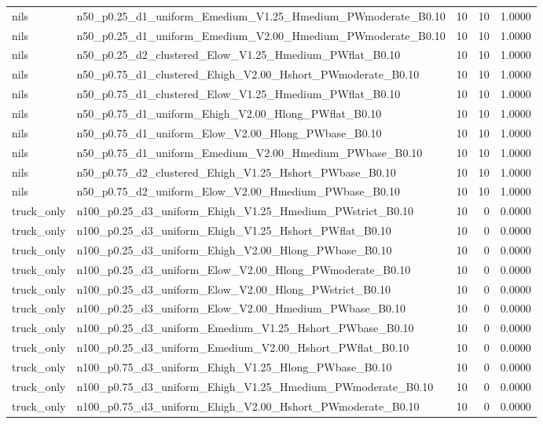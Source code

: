 \begin{tabular}{llrrr}
nils & n50_p0.25_d1_uniform_Emedium_V1.25_Hmedium_PWmoderate_B0.10 & 10 & 10 & 1.0000 \\
nils & n50_p0.25_d1_uniform_Emedium_V2.00_Hmedium_PWmoderate_B0.10 & 10 & 10 & 1.0000 \\
nils & n50_p0.25_d2_clustered_Elow_V1.25_Hmedium_PWflat_B0.10 & 10 & 10 & 1.0000 \\
nils & n50_p0.75_d1_clustered_Ehigh_V2.00_Hshort_PWmoderate_B0.10 & 10 & 10 & 1.0000 \\
nils & n50_p0.75_d1_clustered_Elow_V1.25_Hmedium_PWflat_B0.10 & 10 & 10 & 1.0000 \\
nils & n50_p0.75_d1_uniform_Ehigh_V2.00_Hlong_PWflat_B0.10 & 10 & 10 & 1.0000 \\
nils & n50_p0.75_d1_uniform_Elow_V2.00_Hlong_PWbase_B0.10 & 10 & 10 & 1.0000 \\
nils & n50_p0.75_d1_uniform_Emedium_V2.00_Hmedium_PWbase_B0.10 & 10 & 10 & 1.0000 \\
nils & n50_p0.75_d2_clustered_Ehigh_V1.25_Hshort_PWbase_B0.10 & 10 & 10 & 1.0000 \\
nils & n50_p0.75_d2_uniform_Elow_V2.00_Hmedium_PWbase_B0.10 & 10 & 10 & 1.0000 \\
truck_only & n100_p0.25_d3_uniform_Ehigh_V1.25_Hmedium_PWstrict_B0.10 & 10 & 0 & 0.0000 \\
truck_only & n100_p0.25_d3_uniform_Ehigh_V1.25_Hshort_PWflat_B0.10 & 10 & 0 & 0.0000 \\
truck_only & n100_p0.25_d3_uniform_Ehigh_V2.00_Hlong_PWbase_B0.10 & 10 & 0 & 0.0000 \\
truck_only & n100_p0.25_d3_uniform_Elow_V2.00_Hlong_PWmoderate_B0.10 & 10 & 0 & 0.0000 \\
truck_only & n100_p0.25_d3_uniform_Elow_V2.00_Hlong_PWstrict_B0.10 & 10 & 0 & 0.0000 \\
truck_only & n100_p0.25_d3_uniform_Elow_V2.00_Hmedium_PWbase_B0.10 & 10 & 0 & 0.0000 \\
truck_only & n100_p0.25_d3_uniform_Emedium_V1.25_Hshort_PWbase_B0.10 & 10 & 0 & 0.0000 \\
truck_only & n100_p0.25_d3_uniform_Emedium_V2.00_Hshort_PWflat_B0.10 & 10 & 0 & 0.0000 \\
truck_only & n100_p0.75_d3_uniform_Ehigh_V1.25_Hlong_PWbase_B0.10 & 10 & 0 & 0.0000 \\
truck_only & n100_p0.75_d3_uniform_Ehigh_V1.25_Hmedium_PWmoderate_B0.10 & 10 & 0 & 0.0000 \\
truck_only & n100_p0.75_d3_uniform_Ehigh_V2.00_Hshort_PWmoderate_B0.10 & 10 & 0 & 0.0000 \\

\end{tabular}
